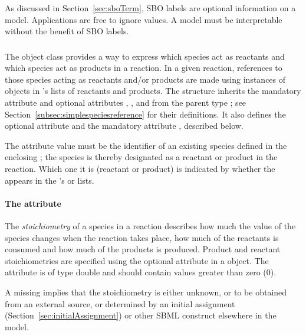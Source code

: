 As discussed in Section~\ref{sec:sboTerm}, SBO labels are optional
information on a model.  Applications are free to ignore
 values.  A model must be interpretable without the
benefit of SBO labels.

\subsubsection{}
\label{subsec:speciesreference}

The \Reaction object class provides a way to express which species
act as reactants and which species act as products in a reaction.
In a given reaction, references to those species acting as
reactants and/or products are made using instances of
\SpeciesReference objects in \Reaction's lists of reactants and
products.  The \SpeciesReference structure inherits the mandatory
attribute  and optional attributes ,
, and  from the parent type
\SimpleSpeciesReference; see
Section~\ref{subsec:simplespeciesreference} for their definitions.
It also defines the optional attribute  and 
the mandatory attribute , described below.

The  attribute value must be the
identifier of an existing species defined in the enclosing \Model;
the species is thereby designated as a reactant or product in the
reaction.  Which one it is (\ie reactant or product) is indicated
by whether the \SpeciesReference appears in the \Reaction's
 or  lists.


\paragraph{The  attribute}

The {\em stoichiometry} of a species in a reaction describes how much 
the value of the species changes when the reaction takes place, \ie 
how much of the reactants is consumed and how much of the products is produced.
Product and reactant stoichiometries are specified using
the optional  attribute 
in a \SpeciesReference object.  The 
attribute is of type double and should contain values greater than
zero (0). 

A missing  implies that the stoichiometry is either unknown, 
or to be obtained from an external source, or determined by an initial
assignment (Section~\ref{sec:initialAssignment}) or other SBML
construct elsewhere in the model.

